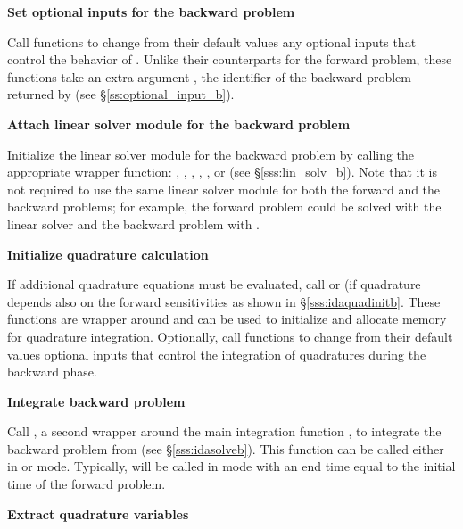 \begin{Steps}
\item
  {\bf Set optional inputs for the backward problem}

  Call  functions to change from their default values
  any optional inputs that control the behavior of {\idas}. Unlike
  their counterparts for the forward problem, these functions take an
  extra argument , the identifier of the backward problem returned 
  by  (see \S\ref{ss:optional_input_b}).


\item \label{i:lin_solverB}
  {\bf Attach linear solver module for the backward problem}

  Initialize the linear solver module 
  for the backward problem by calling the appropriate wrapper
  function: , , ,
  , , or  (see \S\ref{sss:lin_solv_b}). 
  Note that it is not required
  to use the same linear solver module for both the forward and the 
  backward problems; for example, the forward problem could be solved
  with the {\idadense} linear solver and the backward problem with {\idaspgmr}.

\item \label{i:quadB}
  {\bf Initialize quadrature calculation}

  If additional quadrature equations must be evaluated, 
  call  or  (if quadrature depends also on the
  forward sensitivities as shown in \S\ref{sss:idaquadinitb}. These functions are
  wrapper around  and can be used to initialize and allocate 
  memory for quadrature integration. Optionally, call  functions 
  to change from their default values optional inputs that control the integration 
  of quadratures during the backward phase.

\item
  {\bf Integrate backward problem}

  Call , a second wrapper around the {\idas} main integration
  function , to integrate the backward problem from 
  (see \S\ref{sss:idasolveb}). This function can be called either in 
  or  mode. Typically,  will be called in 
  mode with an end time equal to the initial time of the forward problem.

\item \label{i:back_end}
  {\bf Extract quadrature variables}


\end{Steps}
